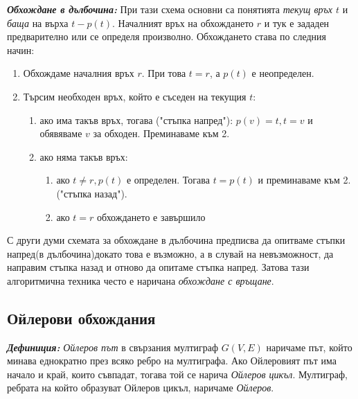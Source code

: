 \documentclass[11pt]{article} %
\newcommand{\italicBold}[1]{\textbf{\emph{#1}}}
\newcommand{\definition}{\italicBold{Дефиниция: }}
\newcommand{\enumNum}{\renewcommand{\theenumi}{\arabic{enumi}}}
\begin{document}
\italicBold{Обхождане в дълбочина:} При тази схема основни са понятията \textit{текущ връх $t$ } и \textit{баща} на върха $t - p(t)$. Началният връх на обхождането $r$ и тук е зададен предварително или се определя произволно. Обхождането става по следния начин:

\enumNum
\begin{enumerate}
	\item Обхождаме началния връх $r$. При това $t = r$, а $p(t)$ е неопределен.\\
	\item Търсим необходен връх, който е съседен на текущия $t$:\\
	\begin{enumerate}[label*=\arabic*.]
    	\item ако има такъв връх, тогава ("стъпка напред"): $p(v) = t, t = v$ и обявяваме $v$ за обходен. Преминаваме към 2.
    	\item ако няма такъв връх:
    		\begin{enumerate}[label*=\arabic*.]
    			\item ако $t \neq r, p(t)$ е определен. Тогава $t = p(t)$ и преминаваме към 2. ("стъпка назад").\\
    			\item ако $t = r$ обхождането е завършило\\
  			\end{enumerate}
  	\end{enumerate}
\end{enumerate} \par

С други думи схемата за обхождане в дълбочина предписва да опитваме стъпки напред(в дълбочина)докато това е възможно, а в слувай на невъзможност, да направим стъпка назад и отново да опитаме стъпка напред. Затова тази алгоритмична техника често е наричана \textit{обхождане с връщане}.

\subsection{Ойлерови обхождания}

\definition \textit{Ойлеров път} в свързания мултиграф $G(V, E)$ наричаме път, който минава еднократно през всяко ребро на мултиграфа. Ако Ойлеровият път има начало и край, които съвпадат, тогава той се нарича \textit{Ойлеров цикъл}. Мултиграф, ребрата на който образуват Ойлеров цикъл, наричаме \textit{Ойлеров}. \par
\end{document}
